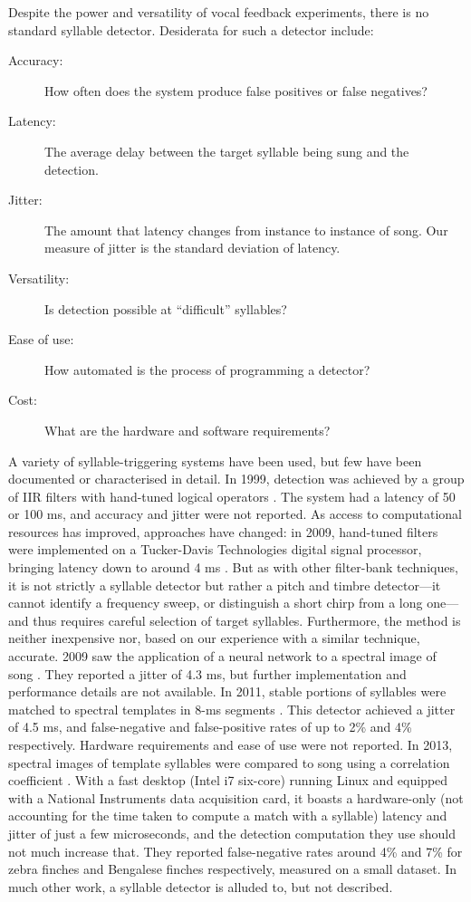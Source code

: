 \documentclass[10pt,letterpaper]{article}
\begin{document}
Despite the power and versatility of vocal feedback experiments, there
is no standard syllable detector.  Desiderata for such a detector include:
\begin{description}
\item[Accuracy:] How often does the system produce false positives or false negatives?
\item[Latency:] The average delay between the target syllable being sung and the detection.
\item[Jitter:] The amount that latency changes from instance to instance of song.  Our measure of jitter is the standard deviation of latency.
\item[Versatility:] Is detection possible at ``difficult'' syllables?
\item[Ease of use:] How automated is the process of programming a detector?
\item[Cost:] What are the hardware and software requirements?
\end{description}

A variety of syllable-triggering systems have been used, but few have
been documented or characterised in detail.  In 1999,
detection was achieved by a group of IIR filters with hand-tuned logical
operators \cite{Leonardo1999}.  The system had a latency of 50 or 100 ms,
and accuracy and jitter were not reported.  As access to
computational resources has improved, approaches have changed: in
2009, hand-tuned filters were implemented on a Tucker-Davis Technologies digital signal processor, bringing latency down to around 4 ms \cite{Andalman2009}. But as with other filter-bank techniques, it
is not strictly a syllable detector but rather a pitch and timbre
detector---it cannot identify a frequency sweep, or distinguish a
short chirp from a long one---and thus requires careful selection of
target syllables.  Furthermore, the method is neither inexpensive nor,
based on our experience with a similar technique, accurate.
2009 saw the application of a neural network to a spectral image of
song \cite{Keller2009}.  They reported a jitter of 4.3 ms, but further implementation and
performance details are not available.  In 2011, stable portions of syllables were matched to spectral templates in 8-ms
segments \cite{Warren2011}.  This detector achieved a jitter of 4.5 ms, and false-negative and
false-positive rates of up to 2\% and 4\% respectively.  Hardware
requirements and ease of use were not reported.  In 2013, spectral
images of template syllables were compared to song using a correlation coefficient \cite{Skocik2013}.  With a
fast desktop (Intel i7 six-core) running Linux and equipped with a
National Instruments data acquisition card, it boasts a hardware-only
(not accounting for the time taken to compute a match with a syllable)
latency and jitter of just a few microseconds, and the detection
computation they use should not much increase that.  They reported
false-negative rates around 4\% and 7\% for zebra finches and
Bengalese finches respectively, measured on a small dataset.  In much
other work, a syllable detector is alluded to, but not described.
\end{document}
